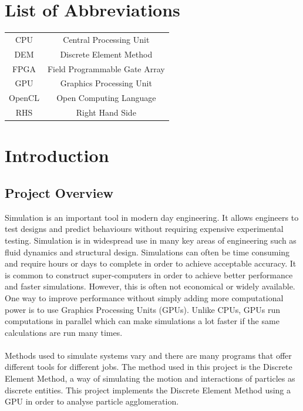 \documentclass[a4paper,11pt,titlepage]{report}
\begin{document}
\printnomenclature
\chapter*{List of Abbreviations}
\begin{tabular}{c c}
CPU & Central Processing Unit \\
DEM & Discrete Element Method \\
FPGA & Field Programmable Gate Array \\
GPU & Graphics Processing Unit \\
OpenCL & Open Computing Language \\
RHS & Right Hand Side \\
\end{tabular}
\chapter{Introduction}
\section{Project Overview}
Simulation is an important tool in modern day engineering. It allows engineers to test designs and predict
behaviours without requiring expensive experimental testing. Simulation is in widespread use in many key
areas of engineering such as fluid dynamics and structural design. Simulations can often be time consuming and require hours or days to complete in order to achieve acceptable accuracy. It is common to construct super-computers in order to achieve better performance and faster simulations. However, this is often not economical or widely available. One way to improve performance without simply adding more computational power is to use Graphics Processing Units (GPUs). Unlike CPUs, GPUs run computations in parallel which can make simulations a lot faster if the same calculations are run many times.
\\\\Methods used to simulate systems vary and there are many programs that offer different tools for different jobs. The method used in this project is the Discrete Element Method, a way of simulating the motion and interactions of particles as discrete entities. This project implements the Discrete Element Method using a GPU in order to analyse particle agglomeration.
\end{document}
